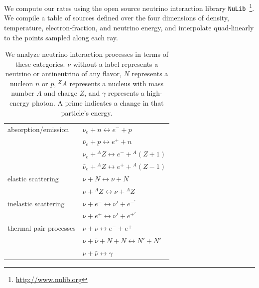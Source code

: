 \documentclass[aps,floatfix,prd,superscriptaddress,twocolumn]{revtex4-1}
\begin{document}
We compute our rates using the open source neutrino interaction
library \lstinline{NuLib}~\footnote{\url{http://www.nulib.org}}.
We compile a table of sources defined over the four dimensions of
density, temperature, electron-fraction, and neutrino energy, and
interpolate quad-linearly to the points sampled along each ray.

\begin{table}%
  \caption{
    We analyze neutrino interaction processes in terms of these categories.
    $\nu$ without a label represents a neutrino or antineutrino of any flavor,
    $N$ represents a nucleon $n$ or $p$,
    ${}^ZA$ represents a nucleus with mass number $A$ and charge $Z$, and
    $\gamma$ represents a high-energy photon.
    A prime indicates a change in that particle's energy.
  }
  \label{tab:neutrino_processes}
  \begin{tabularx}{\columnwidth}{X X}
    \hline \hline
    absorption/emission
    & $\nu_e + n \leftrightarrow e^- + p$                          \\
    & $\bar{\nu}_e + p \leftrightarrow e^+ + n$                    \\
    & $\nu_e + {}^AZ \leftrightarrow e^- + {}^A(Z+1)$              \\
    & $\bar{\nu}_e + {}^AZ \leftrightarrow e^+ + {}^A(Z-1)$        \\
    \hline
    elastic scattering
    & $\nu + N \leftrightarrow \nu + N$                            \\
    & $\nu + {}^AZ \leftrightarrow \nu + {}^AZ$                    \\
    \hline
    inelastic scattering
    & $\nu + e^- \leftrightarrow \nu' + e^{-'}$                    \\
    & $\nu + e^+ \leftrightarrow \nu' + e^{+'}$                    \\
    \hline
    thermal pair processes
    & $\nu + \bar{\nu} \leftrightarrow e^{-} + e^{+}$              \\
    & $\nu + \bar{\nu} + N + N \leftrightarrow N' + N'$            \\
    & $\nu + \bar{\nu} \leftrightarrow \gamma$                     \\
    \hline \hline
  \end{tabularx}
\end{table}
\end{document}
